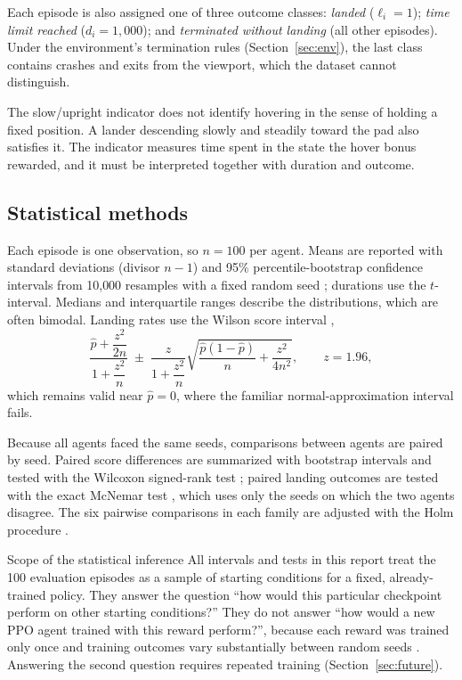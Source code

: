\documentclass[11pt,a4paper]{article}
\begin{document}
Each episode is also assigned one of three outcome classes: \emph{landed} ($\ell_i=1$); \emph{time limit reached} ($d_i=1{,}000$); and \emph{terminated without landing} (all other episodes). Under the environment's termination rules (Section~\ref{sec:env}), the last class contains crashes and exits from the viewport, which the dataset cannot distinguish.

The slow/upright indicator does not identify hovering in the sense of holding a fixed position. A lander descending slowly and steadily toward the pad also satisfies it. The indicator measures time spent in the state the hover bonus rewarded, and it must be interpreted together with duration and outcome.

\subsection{Statistical methods}

Each episode is one observation, so $n=100$ per agent. Means are reported with standard deviations (divisor $n-1$) and 95\% percentile-bootstrap confidence intervals from 10{,}000 resamples with a fixed random seed \cite{efron1993}; durations use the $t$-interval. Medians and interquartile ranges describe the distributions, which are often bimodal. Landing rates use the Wilson score interval \cite{wilson1927},
\begin{equation}
  \frac{\hat p + \dfrac{z^2}{2n}}{1+\dfrac{z^2}{n}} \;\pm\; \frac{z}{1+\dfrac{z^2}{n}}\sqrt{\frac{\hat p(1-\hat p)}{n} + \frac{z^2}{4n^2}}, \qquad z=1.96, \label{eq:wilson}
\end{equation}
which remains valid near $\hat p=0$, where the familiar normal-approximation interval fails.

Because all agents faced the same seeds, comparisons between agents are paired by seed. Paired score differences are summarized with bootstrap intervals and tested with the Wilcoxon signed-rank test \cite{wilcoxon1945}; paired landing outcomes are tested with the exact McNemar test \cite{mcnemar1947}, which uses only the seeds on which the two agents disagree. The six pairwise comparisons in each family are adjusted with the Holm procedure \cite{holm1979}.

\begin{keybox}{Scope of the statistical inference}
All intervals and tests in this report treat the 100 evaluation episodes as a sample of starting conditions for a fixed, already-trained policy. They answer the question ``how would this particular checkpoint perform on other starting conditions?'' They do not answer ``how would a new PPO agent trained with this reward perform?'', because each reward was trained only once and training outcomes vary substantially between random seeds \cite{henderson2018,agarwal2021}. Answering the second question requires repeated training (Section~\ref{sec:future}).
\end{keybox}
\end{document}
